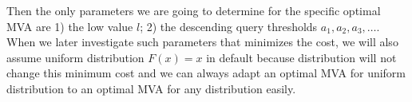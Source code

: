 Then the only parameters we are going to determine for the
specific optimal MVA are 1) the low value $l$; 2) the descending query
thresholds $a_1, a_2, a_3, \ldots$.
When we later investigate such parameters that minimizes the cost, we will
also assume uniform distribution $F(x) = x$ in default because distribution will not
change this minimum cost and we can always adapt an optimal MVA for uniform distribution
to an optimal MVA for any distribution easily.

%
%
%
%
